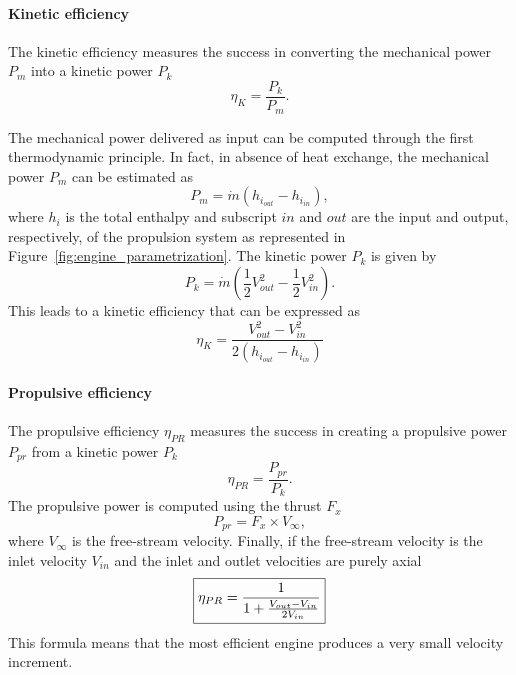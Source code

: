 \paragraph{Kinetic efficiency}
The kinetic efficiency measures the success in converting the mechanical
power $P_m$ into a kinetic power $P_k$
\begin{equation}
	\eta_K = \frac{P_k}{P_m}.
\end{equation}

The mechanical power delivered as input
can be computed through the first thermodynamic principle. In fact, in absence
of heat exchange, the mechanical power $P_m$ can be estimated as
\begin{equation}
	P_m = \dot{m} (h_{i_{out}} - h_{i_{in}}),
\end{equation}
where $h_i$ is the total enthalpy and subscript $in$ and $out$ are
the input and output, respectively, of the propulsion system as represented
in Figure~\ref{fig:engine_parametrization}.
The kinetic power $P_k$ is given by
\begin{equation}
	P_k = \dot{m} \left(\frac{1}{2} V^2_{out} -
	\frac{1}{2} V^2_{in} \right).
\end{equation}
This leads to a kinetic efficiency that can be expressed as
\begin{equation}
	\eta_{K} = \frac{V^2_{out} - V^2_{in}}{2 (h_{i_{out}} - h_{i_{in}})}
\end{equation}

\paragraph{Propulsive efficiency}
The propulsive efficiency $\eta_{PR}$ measures the success
in creating a propulsive power $P_{pr}$ from a
kinetic power $P_k$
\begin{equation}
	\eta_{PR} = \frac{P_{pr}}{P_k}.
\end{equation}
The propulsive power is computed using the thrust $F_x$
\begin{equation}
	P_{pr} = F_x \times V_{\infty},
\end{equation}
where $V_{\infty}$ is the free-stream velocity.
Finally, if the free-stream velocity is the inlet velocity $V_{in}$
and the inlet and outlet velocities are purely axial
\begin{equation}
	\fbox{$
	\eta_{PR} = \displaystyle \frac{1}{1 + \frac{V_{out} - V_{in}}{2 V_{in}}}
	$}
	\label{eq:cror_propulsive_efficiency}
\end{equation}
This formula means that the most efficient engine produces
a very small velocity increment.


